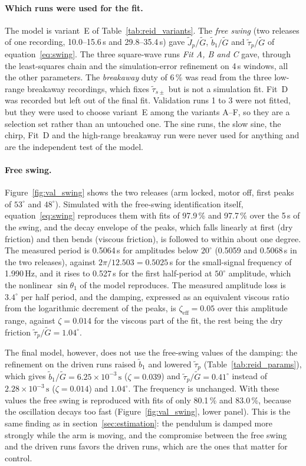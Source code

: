 \documentclass[a4paper,11pt]{article}
\begin{document}
\paragraph{Which runs were used for the fit.} The model is variant~E of Table~\ref{tab:reid_variants}. The \emph{free swing} (two releases of one recording, 10.0--15.6\,s and 29.8--35.4\,s) gave $\tilde J_p/\tilde G$, $\tilde b_1/\tilde G$ and $\tilde\tau_p/\tilde G$ of equation~\ref{eq:swing}. The three square-wave runs \emph{Fit A, B and C} gave, through the least-squares chain and the simulation-error refinement on 4\,s windows, all the other parameters. The \emph{breakaway} duty of 6\,\% was read from the three low-range breakaway recordings, which fixes $\tilde\tau_{s\pm}$ but is not a simulation fit. Fit~D was recorded but left out of the final fit. Validation runs 1 to 3 were not fitted, but they were used to choose variant~E among the variants A--F, so they are a selection set rather than an untouched one. The sine runs, the slow sine, the chirp, Fit~D and the high-range breakaway run were never used for anything and are the independent test of the model.

\paragraph{Free swing.} Figure~\ref{fig:val_swing} shows the two releases (arm locked, motor off, first peaks of $53^\circ$ and $48^\circ$). Simulated with the free-swing identification itself, equation~\ref{eq:swing} reproduces them with fits of 97.9\,\% and 97.7\,\% over the 5\,s of the swing, and the decay envelope of the peaks, which falls linearly at first (dry friction) and then bends (viscous friction), is followed to within about one degree. The measured period is 0.5064\,s for amplitudes below $20^\circ$ (0.5059 and 0.5068\,s in the two releases), against $2\pi/12.503 = 0.5025$\,s for the small-signal frequency of 1.990\,Hz, and it rises to 0.527\,s for the first half-period at $50^\circ$ amplitude, which the nonlinear $\sin\theta_1$ of the model reproduces. The measured amplitude loss is $3.4^\circ$ per half period, and the damping, expressed as an equivalent viscous ratio from the logarithmic decrement of the peaks, is $\zeta_{\mathrm{eff}} = 0.05$ over this amplitude range, against $\zeta = 0.014$ for the viscous part of the fit, the rest being the dry friction $\tilde\tau_p/\tilde G = 1.04^\circ$.

The final model, however, does not use the free-swing values of the damping: the refinement on the driven runs raised $\tilde b_1$ and lowered $\tilde\tau_p$ (Table~\ref{tab:reid_params}), which gives $\tilde b_1/\tilde G = 6.25\times10^{-3}\,\mathrm{s}$ ($\zeta = 0.039$) and $\tilde\tau_p/\tilde G = 0.41^\circ$ instead of $2.28\times10^{-3}\,\mathrm{s}$ ($\zeta = 0.014$) and $1.04^\circ$. The frequency is unchanged. With these values the free swing is reproduced with fits of only 80.1\,\% and 83.0\,\%, because the oscillation decays too fast (Figure~\ref{fig:val_swing}, lower panel). This is the same finding as in section~\ref{sec:estimation}: the pendulum is damped more strongly while the arm is moving, and the compromise between the free swing and the driven runs favors the driven runs, which are the ones that matter for control.
\end{document}
